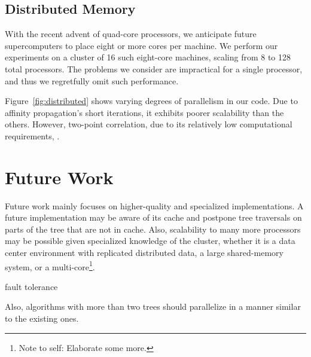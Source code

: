 \documentclass[twoside,leqno,twocolumn]{article}
\newcommand{\authornote}[1]{\footnote{Note to self: #1}}
\newcommand{\authorsnote}[1]{\authornote{#1}}
\newcommand{\fig}[1]{Figure~\ref{fig:#1}}
\begin{document}
\subsection{Distributed Memory}

With the recent advent of quad-core processors, we anticipate future supercomputers to place eight or more cores per machine.
We perform our experiments on a cluster of 16 such eight-core machines, scaling from 8 to 128 total processors.
The problems we consider are impractical for a single processor, and thus we regretfully omit such performance.

\fig{distributed} shows varying degrees of parallelism in our code.
Due to affinity propagation's short iterations, it exhibits poorer scalability than the others.
However, two-point correlation, due to its relatively low computational requirements, .

\section{Future Work}

Future work mainly focuses on higher-quality and specialized implementations.
A future implementation may be aware of its cache and postpone tree traversals on parts of the tree that are not in cache.
Also, scalability to many more processors may be possible given specialized knowledge of the cluster, whether it is a data center environment with replicated distributed data, a large shared-memory system, or a multi-core\authorsnote{Elaborate some more.}.

fault tolerance

Also, algorithms with more than two trees should parallelize in a manner similar to the existing ones.



\end{document}
